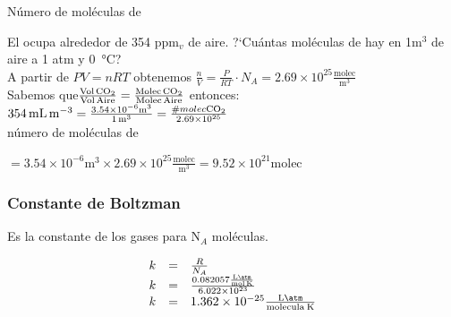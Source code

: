 \begin{ejemplo}{N\'umero de mol\'eculas de }%
\label{ej:moleculasl}

 El  ocupa alrededor de 354 ppm$_v$ de aire. ?`Cu\'antas mol\'eculas de  hay en 1m$^3$ de aire a 1 atm y \SI{0}{\celsius}?\\
 A partir de $PV =nRT$  obtenemos $\frac{n}{V}=\frac{P}{RT}\cdot N_A=2.69\times10^{25} \frac{\textrm{molec}}{\si{\cubic\metre}}$\\
 Sabemos que$ \frac{\ce{Vol CO2}}{\ce{Vol Aire}}=\frac{\ce{Molec CO2}}{\ce{Molec Aire}}$ entonces:\\
\quad $\SI{354}{\milli\liter\per\cubic\metre}=\frac{3.54\times10^{-6}\si{\cubic\metre}}
{\SI{1}{\cubic\metre}}=\frac{\# molec \ce{CO2}}{2.69\times10^{25}}$\\
\quad n\'umero de moléculas de 

$=3.54\times10^{-6}\si{\cubic\metre}\times2.69\times10^{25}\frac{\textrm{molec}}{\si{\cubic\metre}} =9.52\times10^{21}\textrm{molec}$\\
\end{ejemplo}
 
\subsubsection{Constante de Boltzman}
Es la constante de los gases para N$_A$ mol\'eculas.

\[
\begin{array}{rcl}
k  &=&\frac{R}{N_A}  \\
k  &=&\frac{0.082057\frac{\si{\liter\atm}}{\si{\mole\kelvin}}}{6.022\times10^{23}}   \\    
k  &=&1.362\times10^{-25}\frac{\si{\liter\atm}}{\mathrm{molecula}\: \si{\kelvin}}
\end{array}
\]

